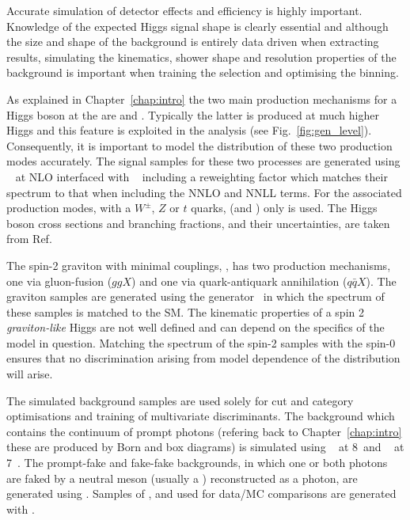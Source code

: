 Accurate simulation of detector effects and efficiency is highly important. Knowledge of the expected Higgs signal shape is clearly essential and although the size and shape of the \mgg background is entirely data driven when extracting results, simulating the kinematics, shower shape and resolution properties of the background is important when training the selection and optimising the binning. 

As explained in Chapter~\ref{chap:intro} the two main production mechanisms for a \SM Higgs boson at the \LHC are \ggH and \VBF. Typically the latter is produced at much higher Higgs \pT and this feature is exploited in the analysis (see Fig.~\ref{fig:gen_level}). Consequently, it is important to model the \pT distribution of these two production modes accurately. The signal samples for these two processes are generated using \POWHEG~\cite{powheg1,powheg2} at NLO interfaced with \PYTHIA~\cite{pythia} including a reweighting factor which matches their \pT spectrum to that when including the NNLO and NNLL terms. For the associated production modes, with a $W^{\pm}$, $Z$ or $t$ quarks, (\VH and \ttH) only \PYTHIA is used. The \SM Higgs boson cross sections and branching fractions, and their uncertainties, are taken from Ref.~\cite{LHCHiggsCrossSectionWorkingGroup3}

The spin-2 graviton with minimal couplings, \graviton, has two production mechanisms, one via gluon-fusion ($ggX$) and one via quark-antiquark annihilation ($q\bar{q}X$). The graviton samples are generated using the \JHU generator~\cite{jhu} in which the \pT spectrum of these samples is matched to the SM. The kinematic properties of a spin 2 \textit{graviton-like} Higgs are not well defined and can depend on the specifics of the model in question. Matching the \pT spectrum of the spin-2 samples with the \SM spin-0 ensures that no discrimination arising from model dependence of the \pT distribution will arise. 

The simulated background samples are used solely for cut and category optimisations and training of multivariate discriminants. The background which contains the \QCD continuum of prompt photons (refering back to Chapter~\ref{chap:intro} these are produced by Born and box diagrams) is simulated using \SHERPA~\cite{sherpa} at 8~\TeV and \MADGRAPH~\cite{madgraph} at 7~\TeV. The prompt-fake and fake-fake backgrounds, in which one or both photons are faked by a neutral meson (usually a \pizero) reconstructed as a photon, are generated using \PYTHIA. Samples of \Zee, \Zmumu and \Zmumugamma used for data/MC comparisons are generated with \POWHEG.

